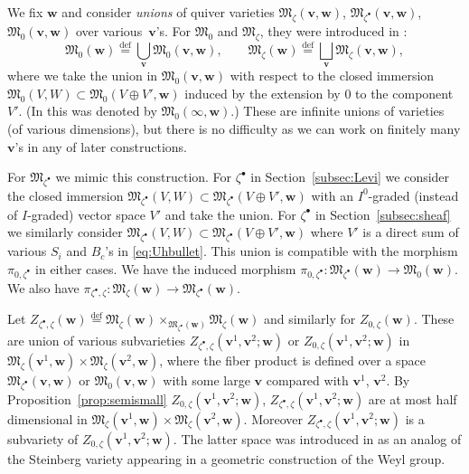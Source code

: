 \documentclass[11pt]{article}
\theoremstyle{definition}
\numberwithin{equation}{section}
\newcommand{\propref}[1]{Proposition~\ref{#1}}
\newcommand{\subsecref}[1]{Section~\ref{#1}}
\newcommand{\defeq}{\overset{\operatorname{\scriptstyle def}}{=}}
\newcommand{\M}{{\mathfrak M}} %
\newcommand{\bv}{{\mathbf v}} %
\newcommand{\bw}{{\mathbf w}} %
\begin{document}
We f\/ix $\bw$ and consider {\it unions\/} of quiver varieties
$\M_{\zeta}(\bv,\bw)$, $\M_{\zeta^\bullet}(\bv,\bw)$, $\M_0(\bv,\bw)$
over va\-rious~$\bv$'s.
%
For $\M_0$ and $\M_{\zeta}$, they were introduced in
\cite[Section~2.5]{Na-qaff}:
\begin{equation*}
   \M_{0}(\bw) \defeq \bigcup_{\bv} \M_{0}(\bv,\bw),\qquad
   \M_{\zeta}(\bw) \defeq \bigsqcup_{\bv} \M_{\zeta}(\bv,\bw),
\end{equation*}
where we take the union in $\M_0(\bv,\bw)$ with respect to the closed
immersion $\M_0(V,W)\subset\M_0(V\oplus V',\bw)$ induced by the
extension by $0$ to the component $V'$. (In \cite[Section~2.5]{Na-qaff}
this was denoted by $\M_0(\infty,\bw)$.) These are inf\/inite unions of
varieties (of various dimensions), but there is no dif\/f\/iculty as we
can work on f\/initely many $\bv$'s in any of later constructions.

For $\M_{\zeta^\bullet}$ we mimic this construction. For
$\zeta^\bullet$ in \subsecref{subsec:Levi} we consider the closed
immersion $\M_{\zeta^\bullet}(V,W)\subset\M_{\zeta^\bullet}(V\oplus
V',\bw)$ with an $I^0$-graded (instead of $I$-graded) vector space
$V'$ and take the union. For $\zeta^\bullet$ in
\subsecref{subsec:sheaf} we similarly consider
$\M_{\zeta^\bullet}(V,W)\subset\M_{\zeta^\bullet}(V\oplus V',\bw)$
where $V'$ is a direct sum of various $S_i$ and $B_c$'s in
\eqref{eq:Uhbullet}.
This union is compatible with the morphism $\pi_{0,\zeta^\bullet}$ in
either cases. We have the induced morphism
$\pi_{0,\zeta^\bullet}\colon \M_{\zeta^\bullet}(\bw)\to \M_0(\bw)$. We
also have $\pi_{\zeta^\bullet,\zeta}\colon
\M_{\zeta}(\bw)\to\M_{\zeta^\bullet}(\bw)$.

Let
\(
  Z_{\zeta^\bullet,\zeta}(\bw) \defeq
  \M_{\zeta}(\bw)\times_{\M_{\zeta^\bullet}(\bw)} \M_\zeta(\bw)
\)
and similarly for $Z_{0,\zeta}(\bw)$. These are union of various
subvarieties $Z_{\zeta^\bullet,\zeta}(\bv^1,\bv^2;\bw)$
or $Z_{0,\zeta}(\bv^1,\bv^2;\bw)$
in $\M_\zeta(\bv^1,\bw)\times\M_\zeta(\bv^2,\bw)$, where the f\/iber
product is def\/ined over a space $\M_{\zeta^\bullet}(\bv,\bw)$
or $\M_0(\bv,\bw)$ with some large $\bv$ compared with $\bv^1$, $\bv^2$.
%
By \propref{prop:semismall} $Z_{0,\zeta}(\bv^1,\bv^2;\bw)$,
$Z_{\zeta^\bullet,\zeta}(\bv^1,\bv^2;\bw)$ are at most
half dimensional in $\M_\zeta(\bv^1,\bw)\times\M_\zeta(\bv^2,\bw)$.
%
Moreover $Z_{\zeta^\bullet,\zeta}(\bv^1,\bv^2;\bw)$ is a subvariety of
$Z_{0,\zeta}(\bv^1,\bv^2;\bw)$.
%
The latter space was introduced in \cite{Na-alg} as an analog of the
Steinberg variety appearing in a geometric construction of the Weyl group.
\end{document}
